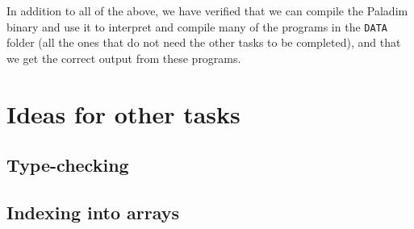 \documentclass{article}
\begin{document}
In addition to all of the above, we have verified that we can compile the Paladim binary and
use it to interpret and compile many of the programs in the \texttt{DATA} folder (all the
ones that do not need the other tasks to be completed), and that we get the correct output
from these programs.

\section{Ideas for other tasks}
\subsection{Type-checking}

\subsection{Indexing into arrays}
\end{document}
